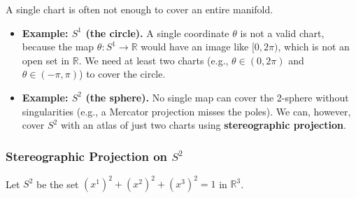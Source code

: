 \documentclass[11pt, a4paper]{report}
\begin{document}
A single chart is often not enough to cover an entire manifold.
\begin{itemize}
    \item \textbf{Example: $S^1$ (the circle).} A single coordinate $\theta$ is not a valid chart, because the map $\theta: S^1 \to \mathbb{R}$ would have an image like $[0, 2\pi)$, which is not an open set in $\mathbb{R}$. We need at least two charts (e.g., $\theta \in (0, 2\pi)$ and $\theta \in (-\pi, \pi)$) to cover the circle.
    
    


    
    
    
    
    \item \textbf{Example: $S^2$ (the sphere).} No single map can cover the 2-sphere without singularities (e.g., a Mercator projection misses the poles). We can, however, cover $S^2$ with an atlas of just two charts using \textbf{stereographic projection}.
\end{itemize}

\subsubsection*{Stereographic Projection on $S^2$}
Let $S^2$ be the set $(x^1)^2 + (x^2)^2 + (x^3)^2 = 1$ in $\mathbb{R}^3$.





\end{document}
